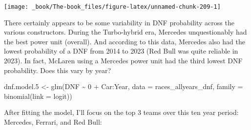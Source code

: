 \documentclass[
]{book}
\newenvironment{Shaded}{\begin{snugshade}}{\end{snugshade}}
\newcommand{\AttributeTok}[1]{\textcolor[rgb]{0.77,0.63,0.00}{#1}}
\newcommand{\DecValTok}[1]{\textcolor[rgb]{0.00,0.00,0.81}{#1}}
\newcommand{\FloatTok}[1]{\textcolor[rgb]{0.00,0.00,0.81}{#1}}
\newcommand{\FunctionTok}[1]{\textcolor[rgb]{0.00,0.00,0.00}{#1}}
\newcommand{\NormalTok}[1]{#1}
\newcommand{\OtherTok}[1]{\textcolor[rgb]{0.56,0.35,0.01}{#1}}
\newcommand{\SpecialCharTok}[1]{\textcolor[rgb]{0.00,0.00,0.00}{#1}}
\newcommand{\StringTok}[1]{\textcolor[rgb]{0.31,0.60,0.02}{#1}}
\begin{document}
\begin{center}\texttt{[image: \_book/The-book\_files/figure-latex/unnamed-chunk-209-1]} \end{center}

There certainly appears to be some variability in DNF probability across the various constructors. During the Turbo-hybrid era, Mercedes unquestionably had the best power unit (overall). And according to this data, Mercedes also had the lowest probability of a DNF from 2014 to 2023 (Red Bull was quite reliable in 2023). In fact, McLaren using a Mercedes power unit had the third lowest DNF probability. Does this vary by year?

\begin{Shaded}
\begin{Highlighting}[]
\NormalTok{dnf.model}\FloatTok{.5} \OtherTok{\textless{}{-}} \FunctionTok{glm}\NormalTok{(DNF }\SpecialCharTok{\textasciitilde{}} \DecValTok{0} \SpecialCharTok{+}\NormalTok{ Car}\SpecialCharTok{:}\NormalTok{Year, }\AttributeTok{data =}\NormalTok{ races\_allyears\_dnf,}
                   \AttributeTok{family =} \FunctionTok{binomial}\NormalTok{(}\AttributeTok{link =} \StringTok{\textquotesingle{}logit\textquotesingle{}}\NormalTok{))}
\end{Highlighting}
\end{Shaded}

After fitting the model, I'll focus on the top 3 teams over this ten year period: Mercedes, Ferrari, and Red Bull:
\end{document}
